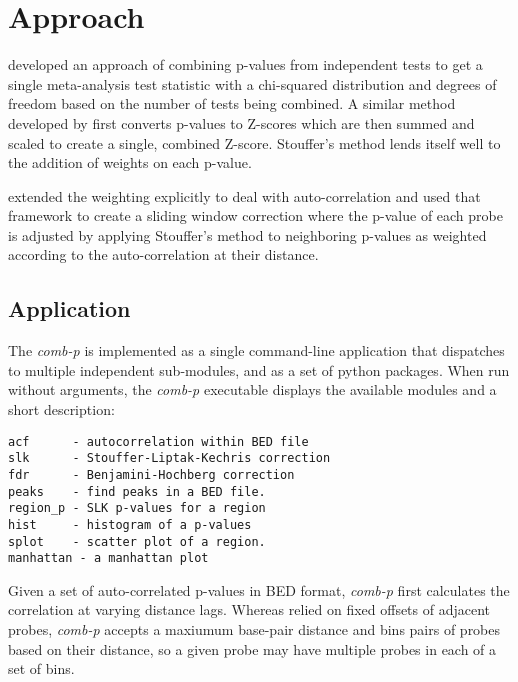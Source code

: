 \documentclass{bioinfo}
\begin{document}
\section{Approach}

\citep{Fisher} developed an approach of combining p-values from independent tests
to get a single meta-analysis test statistic with a chi-squared distribution 
and degrees of freedom based on the number of tests being combined.
A similar method developed by \citep{Stouffer} first converts p-values
to Z-scores which are then summed and scaled to create a single, combined Z-score.
Stouffer's method lends itself well to the addition of weights on each p-value.

\citep{Zaykin} extended the weighting explicitly to deal with auto-correlation and
\citep{Kechris2010} used that framework to create a sliding window correction where
the p-value of each probe is adjusted by applying Stouffer's method to neighboring
p-values as weighted according to the auto-correlation at their distance.


\begin{methods}

\section{Application}
The \textit{comb-p} is implemented as a single command-line application that dispatches to multiple independent sub-modules, and as a set of python packages. When run without arguments, the \textit{comb-p} executable displays the available modules and a short description:
\begin{verbatim}
acf      - autocorrelation within BED file
slk      - Stouffer-Liptak-Kechris correction
fdr      - Benjamini-Hochberg correction
peaks    - find peaks in a BED file.
region_p - SLK p-values for a region
hist     - histogram of a p-values
splot    - scatter plot of a region.
manhattan - a manhattan plot
\end{verbatim}

Given a set of auto-correlated p-values in BED format, \textit{comb-p} first
calculates the correlation at varying distance lags. Whereas \citep{Kechris2010}
relied on fixed offsets of adjacent probes, \textit{comb-p} accepts
a maxiumum base-pair distance and bins pairs of probes based on their
distance, so a given probe may have multiple probes in each of a set of bins.

\end{methods}
\end{document}
